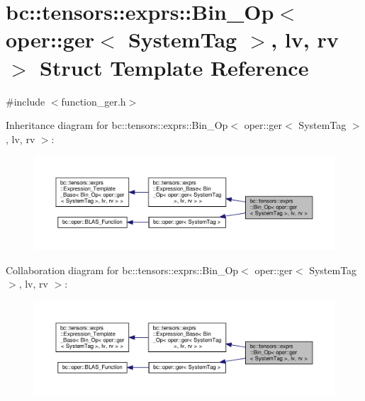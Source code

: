 \hypertarget{structbc_1_1tensors_1_1exprs_1_1Bin__Op_3_01oper_1_1ger_3_01SystemTag_01_4_00_01lv_00_01rv_01_4}{}\section{bc\+:\+:tensors\+:\+:exprs\+:\+:Bin\+\_\+\+Op$<$ oper\+:\+:ger$<$ System\+Tag $>$, lv, rv $>$ Struct Template Reference}
\label{structbc_1_1tensors_1_1exprs_1_1Bin__Op_3_01oper_1_1ger_3_01SystemTag_01_4_00_01lv_00_01rv_01_4}


{\ttfamily \#include $<$function\+\_\+ger.\+h$>$}



Inheritance diagram for bc\+:\+:tensors\+:\+:exprs\+:\+:Bin\+\_\+\+Op$<$ oper\+:\+:ger$<$ System\+Tag $>$, lv, rv $>$\+:\nopagebreak
\begin{figure}[H]
\begin{center}
\leavevmode
\includegraphics[width=350pt]{structbc_1_1tensors_1_1exprs_1_1Bin__Op_3_01oper_1_1ger_3_01SystemTag_01_4_00_01lv_00_01rv_01_4__inherit__graph}
\end{center}
\end{figure}


Collaboration diagram for bc\+:\+:tensors\+:\+:exprs\+:\+:Bin\+\_\+\+Op$<$ oper\+:\+:ger$<$ System\+Tag $>$, lv, rv $>$\+:\nopagebreak
\begin{figure}[H]
\begin{center}
\leavevmode
\includegraphics[width=350pt]{structbc_1_1tensors_1_1exprs_1_1Bin__Op_3_01oper_1_1ger_3_01SystemTag_01_4_00_01lv_00_01rv_01_4__coll__graph}
\end{center}
\end{figure}
